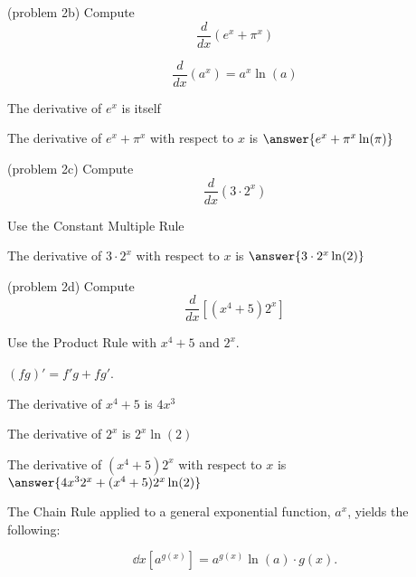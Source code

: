 \documentclass[handout]{ximera}
\begin{document}
\begin{problem}(problem 2b)
  Compute 
  \[
  \frac{d}{dx} \left(e^x + \pi^x\right)
  \]
  
    \begin{hint}
      \[
      \frac{d}{dx} \left(a^x\right) = a^x \ln(a)
      \]
    \end{hint}
		\begin{hint}
		  The derivative of $e^x$ is itself
		\end{hint}
		The derivative of $e^x + \pi^x$ with respect to $x$ is
		 $\answer{e^x  + \pi^x \ln(\pi)}$
	
\end{problem}


\begin{problem}(problem 2c)
  Compute 
  \[
  \frac{d}{dx} \left(3\cdot 2^x\right)
  \]
    
    \begin{hint}
		  Use the Constant Multiple Rule
		\end{hint}
    
		
		The derivative of $3\cdot 2^x$ with respect to $x$ is
		 $\answer{3\cdot 2^x \ln(2)}$
	
\end{problem}



\begin{problem}(problem 2d)
  Compute
  \[
  \frac{d}{dx} \left[(x^4 + 5)2^x\right]
  \]
  
    \begin{hint}
      Use the Product Rule with $x^4 + 5$ and $2^x$.
    \end{hint}
    \begin{hint}
      $(fg)' = f'g+fg'$.
    \end{hint}
    \begin{hint}
      The derivative of $x^4 + 5$ is $4x^3$
    \end{hint}
    \begin{hint}
      The derivative of $2^x$ is $2^x \ln(2)$
    \end{hint}
		The derivative of $(x^4 + 5)2^x$ with respect to $x$ is
		 $\answer{4x^3 2^x + (x^4 + 5) 2^x \ln(2)}$
		
\end{problem}


The Chain Rule applied to a general exponential function, $a^x$, yields the following:

\[
\dd{x} \left[a^{g(x)}\right] = a^{g(x)} \ln(a) \cdot g(x).
\]
\end{document}
